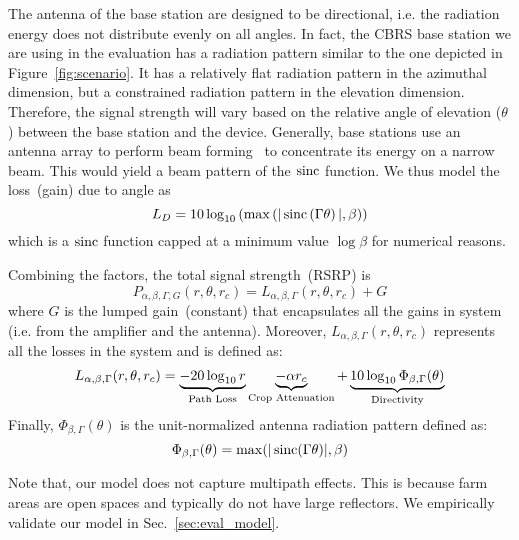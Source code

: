  The antenna of the base station are designed to be directional, i.e. the radiation energy does not distribute evenly on all angles. In fact, the CBRS base station we are using in the evaluation has a radiation pattern similar to the one depicted in Figure~\ref{fig:scenario}. It has a relatively flat radiation pattern in the azimuthal dimension, but a constrained radiation pattern in the elevation dimension. Therefore, the signal strength will vary based on the relative angle of elevation ($\theta$) between the base station and the device. Generally, base stations use an antenna array to perform beam forming~\cite{shepard2012argos} to concentrate its energy on a narrow beam. This would yield a beam pattern of the $\operatorname{sinc}$ function. We thus model the loss~(gain) due to angle as%
\begin{equation}
    \label{eqn:angle-loss}
    L_{D}=10\log_{10}\left(\max\left(|\sinc\left(\Gamma\theta\right)|,\beta\right)\right)%
\end{equation}
which is a $\operatorname{sinc}$ function capped at a minimum value $\log\beta$ for numerical reasons.


Combining the factors, the total signal strength~(RSRP) is%
\begin{equation}
    P_{\alpha, \beta, \Gamma, G}(r, \theta, r_c) = L_{\alpha, \beta, \Gamma}(r, \theta, r_c) + G%
\end{equation}
where $G$ is the lumped gain~(constant) that encapsulates all the gains in system (i.e. from the amplifier and the antenna). Moreover, $L_{\alpha, \beta, \Gamma}(r, \theta, r_c)$ represents all the losses in the system and is defined as:%
\begin{equation}
    \label{eqn:signal-model}
    L_{\alpha, \beta, \Gamma}(r, \theta, r_c) = \underbrace{-20 \log_{10} r}_{\text{Path Loss}} \underbrace{- \alpha r_c}_{\text{Crop Attenuation}} + \underbrace{10 \log_{10} \Phi_{\beta,\Gamma}(\theta)}_{\text{Directivity}}\vspace{-0.01in}
\end{equation}
Finally, $\Phi_{\beta,\Gamma}(\theta)$ is the unit-normalized antenna radiation pattern defined as:%
\begin{equation}
    \Phi_{\beta,\Gamma}(\theta) = \max(|\sinc(\Gamma\theta)|, \beta)%
\end{equation}

Note that, our model does not capture multipath effects. This is because farm areas are open spaces and typically do not have large reflectors. We empirically validate our model in Sec.~\ref{sec:eval_model}.

